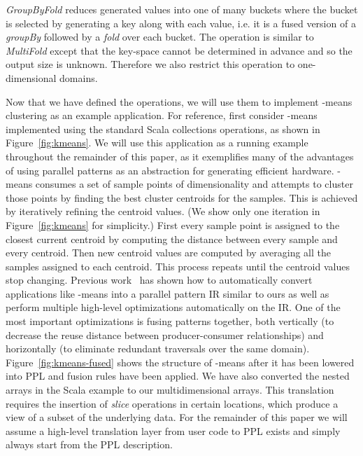 \documentclass[pageno]{jpaper}
\begin{document}
\emph{GroupByFold} reduces generated values into one of many buckets where the bucket is selected by generating a key along with each value, i.e. it is a fused version of a \emph{groupBy} followed by a \emph{fold} over each bucket.  The operation is similar to \emph{MultiFold} except that the key-space cannot be determined in advance and so the output size is unknown. Therefore we also restrict this operation to one-dimensional domains.

Now that we have defined the operations, we will use them to implement -means clustering as an example application.
For reference, first consider -means implemented using the standard Scala collections operations, as shown in Figure~\ref{fig:kmeans}.
We will use this application as a running example throughout the remainder of this paper,
as it exemplifies many of the advantages of using parallel patterns as an abstraction
for generating efficient hardware.  -means consumes a set of  sample points of dimensionality  and attempts to cluster those points by finding the  best cluster centroids for the samples.  This is achieved by iteratively refining the centroid values. (We show only one iteration in Figure~\ref{fig:kmeans} for simplicity.)  First every sample point is assigned to the closest current centroid by computing the distance between every sample and every centroid. Then new centroid values are computed by averaging all the samples assigned to each centroid.  This process repeats until the centroid values stop changing. Previous work~\cite{rompf12optimizing,brown13clusters,chambers10flumejava} has shown how to automatically convert applications like -means into a parallel pattern IR similar to ours as well as perform multiple high-level optimizations automatically on the IR.  One of the most important optimizations is fusing patterns together, both vertically (to decrease the reuse distance between producer-consumer relationships) and horizontally (to eliminate redundant traversals over the same domain).  Figure~\ref{fig:kmeans-fused} shows the structure of -means after it has been lowered into PPL and fusion rules have been applied.  We have also converted the nested arrays in the Scala example to our multidimensional arrays.  This translation requires the insertion of \emph{slice} operations in certain locations, which produce a view of a subset of the underlying data.
For the remainder of this paper we will assume a high-level translation layer from user code to PPL exists and simply always start from the PPL description.
\end{document}

